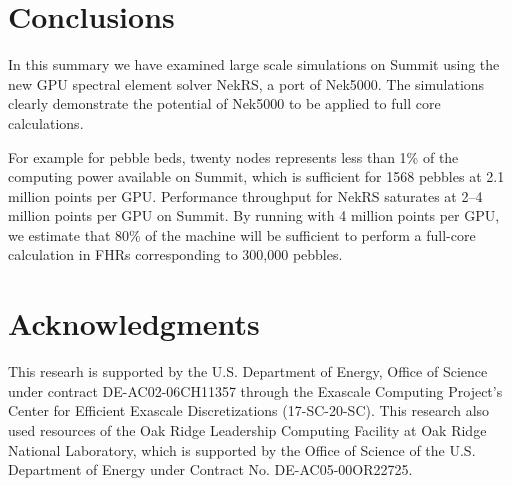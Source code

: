 \documentclass{anstrans}
\begin{document}
\begin{table}
 \caption{NekRS GPU/CPU strong-scale timings (seconds per step) for 100 steps
of turbulent flow simulations with $Re=10000$ for 1568-Pebble case using total
number of grid points $n=179,864,398$ ($E=524,386$ and $N=7$).}
 \label{tab:nekrs1}
\end{table}

\section{Conclusions}

In this summary we have examined large scale simulations on Summit using the
new GPU spectral element solver NekRS, a port of Nek5000. The simulations
clearly demonstrate the potential of Nek5000 to be applied to full core
calculations.

\medskip
For example for pebble beds, twenty nodes represents less than 1\% of the
computing power available on Summit, which is sufficient for 1568 pebbles at
2.1 million points per GPU. Performance throughput for NekRS saturates at 2--4
million points per GPU on Summit. By running with 4 million points per GPU, we
estimate that 80\% of the machine will be sufficient to perform a full-core
calculation in FHRs corresponding to 300,000 pebbles.


\section*{Acknowledgments}

This researh is supported by the U.S. Department of Energy, Office of Science under contract DE-AC02-06CH11357 
through the Exascale Computing Project's Center for Efficient Exascale Discretizations (17-SC-20-SC).
This research also used resources of the Oak Ridge Leadership Computing Facility at Oak Ridge National Laboratory, 
which is supported by the Office of Science of the U.S. Department of Energy under Contract No. DE-AC05-00OR22725.




\end{document}
